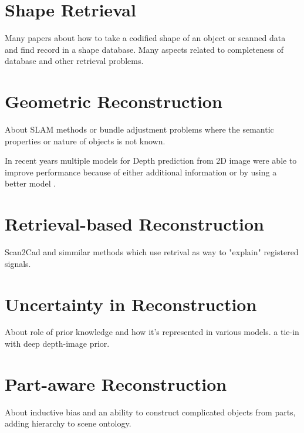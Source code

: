 \section{Shape Retrieval}
\label{sec:shape_retrieval}

Many papers about how to take a codified shape of an object or scanned data and find record in a shape database. Many aspects related to completeness of database and other retrieval problems.




\section{Geometric Reconstruction}
\label{sec:geometric_reconstruction}

About SLAM methods or bundle adjustment problems where the semantic properties or nature of objects is not known.

In recent years multiple models for Depth prediction from 2D image were able to improve performance because of either additional information or by using a better model \cite{jiao2018look,tatarchenko2019single,kendall2018multi}.



\section{Retrieval-based Reconstruction}
\label{sec:retrieval_reconstruction}

Scan2Cad and simmilar methods which use retrival as way to "explain" registered signals.

\section{Uncertainty in Reconstruction}
\label{sec:uncertainty_reconstruction}

About role of prior knowledge and how it's represented in various models. a tie-in with deep depth-image prior.

\section{Part-aware Reconstruction}
\label{sec:part_reconstruction}



About inductive bias and an ability to construct complicated objects from parts, adding hierarchy to scene ontology.